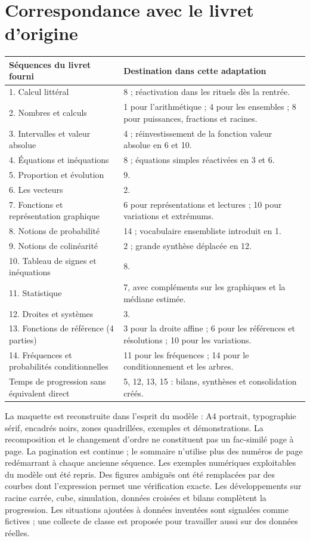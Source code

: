 \section*{Correspondance avec le livret d'origine}
\begin{center}\small{}\begin{tabularx}{\linewidth}{p{6.3cm} X}
\textbf{Séquences du livret fourni}&\textbf{Destination dans cette adaptation}\\\hline
1. Calcul littéral&8 ; réactivation dans les rituels dès la rentrée.\\
2. Nombres et calculs&1 pour l'arithmétique ; 4 pour les ensembles ; 8 pour puissances, fractions et racines.\\
3. Intervalles et valeur absolue&4 ; réinvestissement de la fonction valeur absolue en 6 et 10.\\
4. Équations et inéquations&8 ; équations simples réactivées en 3 et 6.\\
5. Proportion et évolution&9.\\
6. Les vecteurs&2.\\
7. Fonctions et représentation graphique&6 pour représentations et lectures ; 10 pour variations et extrémums.\\
8. Notions de probabilité&14 ; vocabulaire ensembliste introduit en 1.\\
9. Notions de colinéarité&2 ; grande synthèse déplacée en 12.\\
10. Tableau de signes et inéquations&8.\\
11. Statistique&7, avec compléments sur les graphiques et la médiane estimée.\\
12. Droites et systèmes&3.\\
13. Fonctions de référence (4 parties)&3 pour la droite affine ; 6 pour les références et résolutions ; 10 pour les variations.\\
14. Fréquences et probabilités conditionnelles&11 pour les fréquences ; 14 pour le conditionnement et les arbres.\\\hline
Temps de progression sans équivalent direct&5, 12, 13, 15 : bilans, synthèses et consolidation créés.
\end{tabularx}\end{center}
La maquette est reconstruite dans l'esprit du modèle : A4 portrait, typographie sérif, encadrés noirs, zones quadrillées, exemples et démonstrations. La recomposition et le changement d'ordre ne constituent pas un fac-similé page à page. La pagination est continue ; le sommaire n'utilise plus des numéros de page redémarrant à chaque ancienne séquence.
Les exemples numériques exploitables du modèle ont été repris. Des figures ambiguës ont été remplacées par des courbes dont l'expression permet une vérification exacte. Les développements sur racine carrée, cube, simulation, données croisées et bilans complètent la progression. Les situations ajoutées à données inventées sont signalées comme fictives ; une collecte de classe est proposée pour travailler aussi sur des données réelles.

